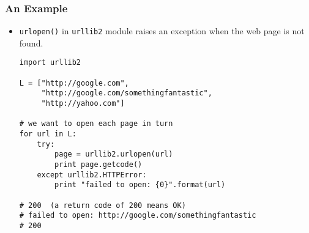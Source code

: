 \documentclass{beamer}
\begin{document}
\begin{frame}[fragile]
\frametitle{An Example}
\begin{itemize}
\item \lstinline{urlopen()} in \lstinline{urllib2}
      module raises
      an exception when the web page is not found.
\begin{lstlisting}
import urllib2

L = ["http://google.com",
     "http://google.com/somethingfantastic",
     "http://yahoo.com"]

# we want to open each page in turn
for url in L:
    try:
        page = urllib2.urlopen(url)
        print page.getcode()
    except urllib2.HTTPError:
        print "failed to open: {0}".format(url)

# 200  (a return code of 200 means OK)
# failed to open: http://google.com/somethingfantastic
# 200 
\end{lstlisting}
\end{itemize}
\end{frame}
\end{document}
